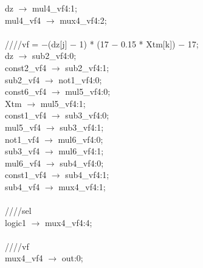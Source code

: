    \hspace*{2em}dz $\rightarrow$ mul4\_vf4:1; \\
   \hspace*{2em}mul4\_vf4 $\rightarrow$ mux4\_vf4:2; \\
   \\
   \hspace*{2em}////vf = $-$(dz[j] $-$ 1) * (17 $-$ 0.15 * Xtm[k]) $-$ 17; \\
   \hspace*{2em}dz $\rightarrow$ sub2\_vf4:0; \\
   \hspace*{2em}const2\_vf4 $\rightarrow$ sub2\_vf4:1; \\
   \hspace*{2em}sub2\_vf4 $\rightarrow$ not1\_vf4:0; \\
   \hspace*{2em}const6\_vf4 $\rightarrow$ mul5\_vf4:0; \\
   \hspace*{2em}Xtm $\rightarrow$ mul5\_vf4:1; \\
   \hspace*{2em}const1\_vf4 $\rightarrow$ sub3\_vf4:0; \\
   \hspace*{2em}mul5\_vf4 $\rightarrow$ sub3\_vf4:1; \\
   \hspace*{2em}not1\_vf4 $\rightarrow$ mul6\_vf4:0; \\
   \hspace*{2em}sub3\_vf4 $\rightarrow$ mul6\_vf4:1; \\
   \hspace*{2em}mul6\_vf4 $\rightarrow$ sub4\_vf4:0; \\
   \hspace*{2em}const1\_vf4 $\rightarrow$ sub4\_vf4:1; \\
   \hspace*{2em}sub4\_vf4 $\rightarrow$ mux4\_vf4:1; \\
   \\
   \hspace*{2em}////sel \\
   \hspace*{2em}logic1 $\rightarrow$ mux4\_vf4:4; \\
   \\
   \hspace*{2em}////vf \\
   \hspace*{2em}mux4\_vf4 $\rightarrow$ out:0; \\
